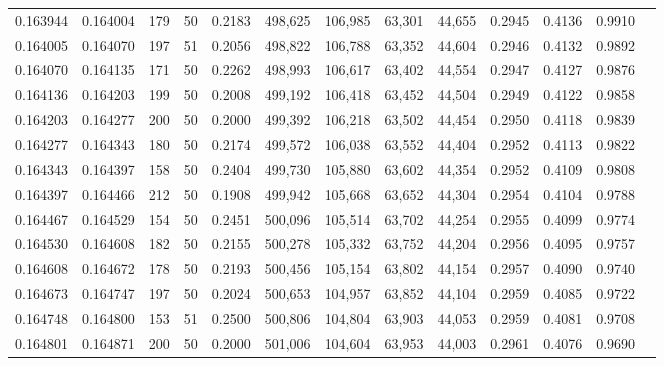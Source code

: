 \begin{tabular}{rrrrrrrrrrrrr}
0.163944 & 0.164004 &   179 &  50 &                                     0.2183 & 498,625 & 106,985 &  63,301 &  44,655 & 0.2945 & 0.4136 & 0.9910 \\
0.164005 & 0.164070 &   197 &  51 &                                     0.2056 & 498,822 & 106,788 &  63,352 &  44,604 & 0.2946 & 0.4132 & 0.9892 \\
0.164070 & 0.164135 &   171 &  50 &                                     0.2262 & 498,993 & 106,617 &  63,402 &  44,554 & 0.2947 & 0.4127 & 0.9876 \\
0.164136 & 0.164203 &   199 &  50 &                                     0.2008 & 499,192 & 106,418 &  63,452 &  44,504 & 0.2949 & 0.4122 & 0.9858 \\
0.164203 & 0.164277 &   200 &  50 &                                     0.2000 & 499,392 & 106,218 &  63,502 &  44,454 & 0.2950 & 0.4118 & 0.9839 \\
0.164277 & 0.164343 &   180 &  50 &                                     0.2174 & 499,572 & 106,038 &  63,552 &  44,404 & 0.2952 & 0.4113 & 0.9822 \\
0.164343 & 0.164397 &   158 &  50 &                                     0.2404 & 499,730 & 105,880 &  63,602 &  44,354 & 0.2952 & 0.4109 & 0.9808 \\
0.164397 & 0.164466 &   212 &  50 &                                     0.1908 & 499,942 & 105,668 &  63,652 &  44,304 & 0.2954 & 0.4104 & 0.9788 \\
0.164467 & 0.164529 &   154 &  50 &                                     0.2451 & 500,096 & 105,514 &  63,702 &  44,254 & 0.2955 & 0.4099 & 0.9774 \\
0.164530 & 0.164608 &   182 &  50 &                                     0.2155 & 500,278 & 105,332 &  63,752 &  44,204 & 0.2956 & 0.4095 & 0.9757 \\
0.164608 & 0.164672 &   178 &  50 &                                     0.2193 & 500,456 & 105,154 &  63,802 &  44,154 & 0.2957 & 0.4090 & 0.9740 \\
0.164673 & 0.164747 &   197 &  50 &                                     0.2024 & 500,653 & 104,957 &  63,852 &  44,104 & 0.2959 & 0.4085 & 0.9722 \\
0.164748 & 0.164800 &   153 &  51 &                                     0.2500 & 500,806 & 104,804 &  63,903 &  44,053 & 0.2959 & 0.4081 & 0.9708 \\
0.164801 & 0.164871 &   200 &  50 &                                     0.2000 & 501,006 & 104,604 &  63,953 &  44,003 & 0.2961 & 0.4076 & 0.9690 \\

\end{tabular}
